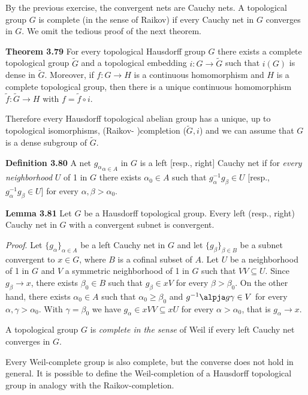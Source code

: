 \documentclass[12pt]{article}
\begin{document}
By the previous exercise, the convergent nets are Cauchy nets. A topological group $G$ is complete (in the
sense of Raikov) if every Cauchy net in $G$ converges in $G$. We omit the tedious proof of the next theorem.


\textbf{Theorem 3.79} For every topological Hausdorff group $G$ there exists a complete topological group $\tilde{G}$ and a
topological embedding $i : G \to \tilde{G}$ such that $i(G)$ is dense in $\tilde{G}$. Moreover, if $f : G \to H$ is a continuous
homomorphism and $H$ is a complete topological group, then there is a unique continuous homomorphism 
$\tilde{f} : \tilde{G} \to H$ with $f = \tilde{f} \circ i$.


Therefore every Hausdorff topological abelian group has a unique, up to topological isomorphisms, (Raikov-
)completion ($\tilde{G}, i$) and we can assume that $G$ is a dense subgroup of $\tilde{G}$.


\textbf{Definition 3.80} A net ${g_\alpha}_{\alpha \in A}$ in $G$ is a left [resp., right] Cauchy net if for \emph{every neighborhood} $U$ of 1 in $G$
there exists $\alpha_0 \in A$ such that $g^{-1}_\alpha g_\beta \in U$ [resp., $g^{-1}_\alpha g_\beta \in U$] for every $\alpha, \beta > \alpha_0$.


\textbf{Lemma 3.81} Let $G$ be a Hausdorff topological group. Every left (resp., right) Cauchy net in $G$ with a
convergent subnet is convergent.


\emph{Proof}. Let $\{g_\alpha \}_{\alpha \in A}$ be a left Cauchy net in $G$ and let $\{g_\beta\}_{\beta \in B}$ be a subnet convergent to $x \in G$, where $B$ is a
cofinal subset of $A$. Let $U$ be a neighborhood of 1 in $G$ and $V$ a symmetric neighborhood of 1 in $G$ such that
$V V \subseteq U$. Since $g_\beta \to x$, there exists $\beta_0 \in B$ such that $g_\beta \in xV$ for every $\beta > \beta_0$. On the other hand, there
exists $\alpha_0 \in A$ such that $\alpha_0 \geq \beta_0$ and $g^{-1}\alpja g\gamma \in V$ for every $\alpha, \gamma > \alpha_0$. With $\gamma = \beta_0$ we have $g_\alpha \in xV V \subseteq xU$ for
every $\alpha > \alpha_0$, that is $g_\alpha \to x$.


    A topological group $G$ is \emph{complete in the sense} of Weil if every left Cauchy net converges in $G$.


    Every Weil-complete group is also complete, but the converse does not hold in general. It is possible to
define the Weil-completion of a Hausdorff topological group in analogy with the Raikov-completion.
\end{document}
